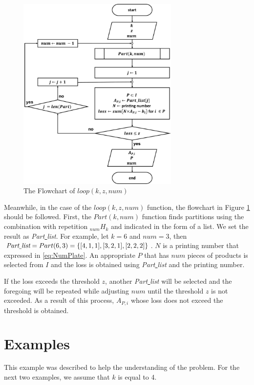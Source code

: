 \documentclass[a4paper]{amsart}
\numberwithin{equation}{section} %
\numberwithin{figure}{section} %
\numberwithin{table}{section}
\theoremstyle{plain}
\theoremstyle{definition}
\theoremstyle{plain}
\theoremstyle{plain}
\theoremstyle{plain}
\theoremstyle{plain}
\theoremstyle{plain}
\begin{document}
\begin{figure}[h!]
	\centering
	\includegraphics[width=8cm]{SubFChart.pdf}
	\caption{The Flowchart of ${loop}(k, z, num)$}
	\label{fig:SFChart}       %
\end{figure}

Meanwhile, in the case of the ${loop}(k, z, num)$ function, the flowchart in Figure \ref{fig:SFChart} should be followed.
First, the ${Part}(k, num)$ function finds partitions using the combination with repetition $_{num}H_{k}$ 
and indicated in the form of a list. 
We set the result as {\it Part\underline{ }list}.
For example, let $k=6$ and $num=3$, then $\text{\it Part\underline{ }list}={Part}(6, 3) = \{ [4,1,1],[3,2,1],[2,2,2] \}$.
$N$ is a printing number that expressed in \eqref{eq:NumPlate}.
An appropriate $P$ that has $num$ pieces of products is selected from $I$ and the loss is obtained using {\it Part\underline{ }list} and the printing number.

If the loss exceeds the threshold $z$, another {\it Part\underline{ }list} will be selected and the foregoing will be repeated  while adjusting $num$ until the threshold $z$ is not exceeded.
As a result of this process, $A_{P,i}$ whose loss does not exceed the threshold is obtained.%



\section{Examples}\label{sec:Exam}
This example was described to help the understanding of the problem. For the next two examples, we assume that $k$ is equal to 4.
\end{document}
